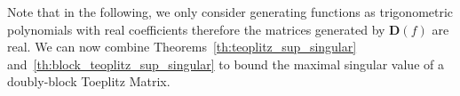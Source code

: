 Note that in the following, we only consider generating functions as trigonometric polynomials with real coefficients therefore the matrices generated by $\mathbf{D}(f)$ are real. We can now combine Theorems~\ref{th:teoplitz_sup_singular} and~\ref{th:block_teoplitz_sup_singular} to bound the maximal singular value of a doubly-block Toeplitz Matrix. 


